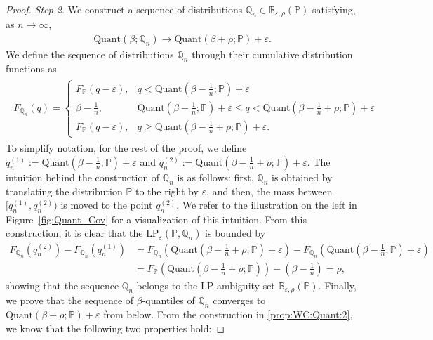 \documentclass[11pt,a4paper]{article}
\begin{document}
\begin{proof}
\noindent\emph{Step 2.} We construct a sequence of distributions $\mathbb Q_n \in \mathbb{B}_{\varepsilon, \rho}(\mathbb P)$ satisfying, as $n \to \infty$,
\begin{align*}
    \text{Quant}(\beta; \mathbb Q_n) \to \text{Quant}(\beta+\rho; \mathbb P)+\varepsilon.
\end{align*}
We define the sequence of distributions $\mathbb Q_n$ through their cumulative distribution functions as
\begin{align}
\label{prop:WC:Quant:2}
\begin{split}
    F_{\mathbb Q_n}(q) = \begin{cases}
    F_{\mathbb P}(q-\varepsilon), & q < \text{Quant}\left(\beta-\frac{1}{n}; \mathbb P \right) +\varepsilon\\
    \beta-\frac{1}{n}, &\text{Quant} \left(\beta-\frac{1}{n}; \mathbb P \right) +\varepsilon \leq q < \text{Quant} \left(\beta-\frac{1}{n}+\rho; \mathbb P \right)+\varepsilon\\
    F_{\mathbb P}(q-\varepsilon), & q \geq \text{Quant} \left(\beta-\frac{1}{n}+\rho; \mathbb P \right)+\varepsilon.
    \end{cases}
\end{split}
\end{align}
To simplify notation, for the rest of the proof, we define $q^{(1)}_n := \text{Quant}(\beta-\frac{1}{n}; \mathbb P)+\varepsilon$ and $q^{(2)}_n := \text{Quant}(\beta-\frac{1}{n}+\rho; \mathbb P)+\varepsilon$. The intuition behind the construction of $\mathbb Q_n$ is as follows: first, $\mathbb{Q}_n$ is obtained by translating the distribution $\mathbb P$ to the right by $\varepsilon$, and then, the mass between $[q^{(1)}_n,q^{(2)}_n)$ is moved to the point $q^{(2)}_n$. We refer to the illustration on the left in Figure~\ref{fig:Quant_Cov} for a visualization of this intuition. From this construction, it is clear that the $\text{LP}_\varepsilon(\mathbb P, \mathbb{Q}_n)$ is bounded by
\begin{align*}
    F_{\mathbb{Q}_n} \left(q^{(2)}_n \right)-F_{\mathbb{Q}_n} \left(q^{(1)}_n \right) &= F_{\mathbb{Q}_n} \left(\text{Quant} \left(\beta-\frac{1}{n}+\rho; \mathbb P \right)+\varepsilon \right)-F_{\mathbb{Q}_n} \left(\text{Quant} \left(\beta-\frac{1}{n}; \mathbb P \right)+\varepsilon \right) 
    \\& = F_{\mathbb P}\left(\text{Quant} \left(\beta-\frac{1}{n}+\rho; \mathbb P \right) \right) - \left( \beta - \frac{1}{n} \right)
    = \rho,
\end{align*}
showing that the sequence $\mathbb Q_n$ belongs to the LP ambiguity set $\mathbb{B}_{\varepsilon, \rho}(\mathbb P)$. Finally, we prove that the sequence of $\beta$-quantiles of $\mathbb{Q}_n$ converges to $\text{Quant}(\beta+\rho; \mathbb P)+\varepsilon$ from below. From the construction in \eqref{prop:WC:Quant:2}, we know that the following two properties hold:

\end{proof}
\end{document}
